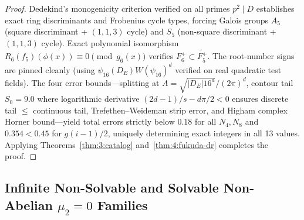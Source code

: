 \begin{proof}
Dedekind's monogenicity criterion verified on all primes $p^2 \mid D$ establishes exact ring discriminants and Frobenius cycle types, forcing Galois groups $A_5$ (square discriminant + $(1,1,3)$ cycle) and $S_5$ (non-square discriminant + $(1,1,3)$ cycle). Exact polynomial isomorphism $R_6(f_5)(\phi(x)) \equiv 0 \pmod{g_6(x)}$ verifies $F_6^+ \subset \widetilde{F_5^+}$. The root-number signs are pinned cleanly (using $\psi_{16}(D_E)W(\psi_{16})^d$ verified on real quadratic test fields). The four error bounds—splitting at $A = \sqrt{|D_E| 16^d}/(2\pi)^d$, contour tail $S_0 = 9.0$ where logarithmic derivative $(2d-1)/s - d\pi/2 < 0$ ensures discrete tail $\le$ continuous tail, Trefethen--Weideman strip error, and Higham complex Horner bound—yield total errors strictly below $0.18$ for all $N_4, N_8$ and $0.354 < 0.45$ for $g(i-1)/2$, uniquely determining exact integers in all 13 values. Applying Theorems~\ref{thm:3:catalog} and~\ref{thm:4:fukuda-dr} completes the proof.
\end{proof}

\subsection{Infinite Non-Solvable and Solvable Non-Abelian $\mu_2 = 0$ Families}\label{sec:4:inf-nonab}

